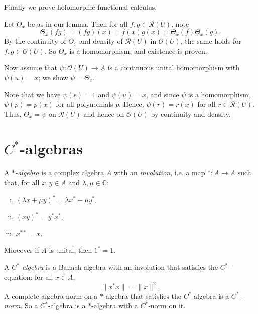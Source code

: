 \documentclass[12pt]{article}
\begin{document}
Finally we prove holomorphic functional calculus.

\begin{proofbox}
	Let $\Theta_x$ be as in our lemma. Then for all $f, g \in \mathcal{R}(U)$, note
	\[
	\Theta_x(fg) = (fg)(x) = f(x) g(x) = \Theta_x(f) \Theta_x(g).
	\]
	By the continuity of $\Theta_x$ and density of $\mathcal{R}(U)$ in $\mathcal{O}(U)$, the same holds for $f, g \in \mathcal{O}(U)$. So $\Theta_x$ is a homomorphism, and existence is proven.

	Now assume that $\psi : \mathcal{O}(U) \to A$ is a continuous unital homomorphism with $\psi(u) = x$; we show $\psi = \Theta_x$.

	Note that we have $\psi(e) = 1$ and $\psi(u)= x$, and since $\psi$ is a homomorphism, $\psi(p) = p(x)$ for all polynomials $p$. Hence, $\psi(r) = r(x)$ for all $r \in \mathcal{R}(U)$. Thus, $\Theta_x = \psi$ on $\mathcal{R}(U)$ and hence on $\mathcal{O}(U)$ by continuity and density.
\end{proofbox}

\newpage

\section{\texorpdfstring{$C^{\ast}$}{C*}-algebras}%
\label{sec:calg}

\begin{definition}
A \emph{$\ast$-algebra} is a complex algebra $A$ with an \emph{involution}, i.e. a map $\ast : A \to A$ such that, for all $x, y \in A$ and $\lambda, \mu \in \mathbb{C}$:
\begin{enumerate}[(i)]
	\item $(\lambda x + \mu y)^{\ast} = \bar \lambda x^{\ast} + \bar \mu y^{\ast}$.
	\item $(xy)^{\ast} = y^{\ast} x^{\ast}$.
	\item $x^{\ast\ast} = x$.
\end{enumerate}
Moreover if $A$ is unital, then $1^{\ast} = 1$.
\end{definition}

\begin{definition}
	A \emph{$C^{\ast}$-algebra} is a Banach algebra with an involution that satisfies the $C^{\ast}$-equation: for all $x \in A$,
	\[
		\|x^{\ast} x\| = \|x\|^2.
	\]
	A complete algebra norm on a $\ast$-algebra that satisfies the $C^{\ast}$-algebra is a \emph{$C^{\ast}$-norm}. So a $C^{\ast}$-algebra is a $\ast$-algebra with a $C^{\ast}$-norm on it.
\end{definition}
\end{document}
